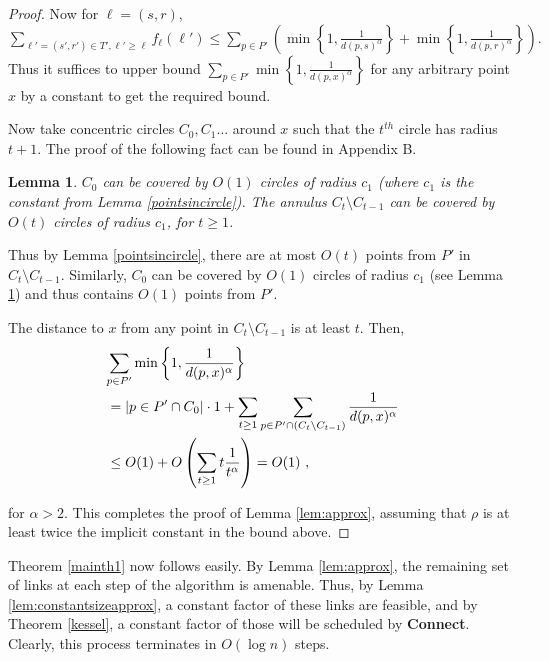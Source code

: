 \documentclass[11pt]{amsart}
\newcounter{foo}
\newtheorem{lemma}[foo]{Lemma}
\begin{document}
\begin{proof}
Now for $\ell = (s, r)$, $\sum_{\ell' = (s',r') \in T', \ell' \geq \ell} f_{\ell}(\ell')
  \leq \sum_{p \in P'}  \left(\min\left\{1, \frac{1}{d(p,s)^{\alpha}}\right\} 
   + \min\left\{1, \frac{1}{d(p,r)^{\alpha}}\right\}\right).$
Thus it suffices to upper bound $\sum_{p \in P'} \min\left\{1,
\frac{1}{d(p, x)^{\alpha}}\right\}$ for any arbitrary point $x$ by a constant
to get the required bound.

Now take concentric circles $C_0, C_1 \ldots$ around $x$ such that the $t^{th}$ 
circle has radius $t+1$.
The proof of the following fact
can be found in Appendix B. 
\begin{lemma}
$C_0$ can be covered by $O(1)$ circles of radius $c_1$
 (where $c_1$ is the constant from Lemma \ref{pointsincircle}). 
The annulus $C_t \setminus C_{t-1}$ can be covered by $O(t)$ circles of radius $c_1$, for $t \geq 1$.
\label{ddim}
\end{lemma}
Thus by Lemma \ref{pointsincircle}, there are at most $O(t)$ points from $P'$ in $C_t \setminus C_{t-1}$. Similarly,
$C_0$ can be covered by $O(1)$ circles of radius $c_1$ (see Lemma \ref{ddim}) and thus contains $O(1)$ points from $P'$.

The distance to $x$ from any point in $C_t \setminus C_{t-1}$ is at least $t$. Then,
\begin{align*}
\lefteqn{\sum_{p \in P'}  \min\left\{1, \frac{1}{d(p, x)^{\alpha}}\right\}}  \\
& = |p \in P' \cap C_0| \cdot 1 + \sum_{t \geq 1} \sum_{p \in P' \cap (C_t \setminus C_{t-1})} \frac{1}{d(p, x)^{\alpha}} \\
& \leq O(1) + O\left(\sum_{t \geq 1} t \frac{1}{t^{\alpha}}\right) = O(1)\ ,
\end{align*}
\iffalse
\begin{eqnarray*}
\sum_{p \in P'}  \min\left\{1, \frac{1}{d(p, x)^{\alpha}}\right\} \\  
= |p \in P' \cap C_0| \cdot 1 + \sum_{t \geq 1} \sum_{p \in P' \cap (C_t \setminus C_{t-1})} \frac{1}{d(p, x)^{\alpha}} \\
 \leq O(1) + O\left(\sum_{t \geq 1} t \frac{1}{t^{\alpha}}\right) = O(1)\ ,
\end{eqnarray*}
\fi
for $\alpha > 2$. This completes the proof of Lemma \ref{lem:approx},
assuming that $\rho$ is at least twice the implicit constant in
the bound above.
\end{proof}


Theorem \ref{mainth1} now follows easily. By Lemma \ref{lem:approx}, the remaining set of links at each step
of the algorithm is amenable. Thus, by Lemma
\ref{lem:constantsizeapprox}, a constant factor of these links are feasible, and by Theorem \ref{kessel}, a constant
factor of those will be scheduled by {\bf Connect}. Clearly, this process terminates in $O(\log n)$ steps.
\end{document}
